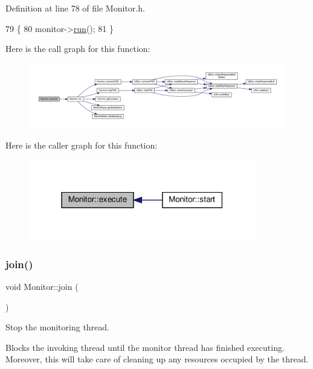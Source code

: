 Definition at line 78 of file Monitor.\+h.


\begin{DoxyCode}
79     \{
80         monitor->\hyperlink{class_monitor_a81666ecd4a8db05fd3090f7e47eca6ed}{run}();
81     \}
\end{DoxyCode}
Here is the call graph for this function\+:\nopagebreak
\begin{figure}[H]
\begin{center}
\leavevmode
\includegraphics[width=350pt]{d9/df7/class_monitor_a79e0c78d0973bee48418aedf3aedb2ba_cgraph}
\end{center}
\end{figure}
Here is the caller graph for this function\+:\nopagebreak
\begin{figure}[H]
\begin{center}
\leavevmode
\includegraphics[width=279pt]{d9/df7/class_monitor_a79e0c78d0973bee48418aedf3aedb2ba_icgraph}
\end{center}
\end{figure}
\mbox{\label{class_monitor_a2d2e309666c98333a317c9786f94f6ad}} 
\subsubsection{\texorpdfstring{join()}{join()}}
{\footnotesize\ttfamily void Monitor\+::join (\begin{DoxyParamCaption}{ }\end{DoxyParamCaption})}

Stop the monitoring thread.

Blocks the invoking thread until the monitor thread has finished executing. Moreover, this will take care of cleaning up any resources occupied by the thread. 

